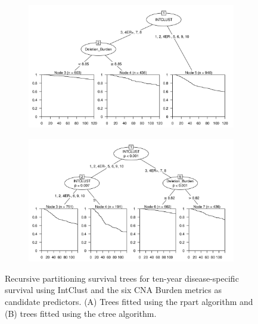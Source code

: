 \begin{figure}[!h]
\centering

\vspace{0.5cm}

\begin{subfigure}{\textwidth}
\subcaption{}
\includegraphics[width=1\textwidth]{../figures/Chapter_3/PartyKit_Survival_Burden_TenYearDSS_INTCLUST.png}
\end{subfigure}

\vspace{2cm}

\begin{subfigure}{\textwidth}
\subcaption{}
\includegraphics[width=1\textwidth]{../figures/Chapter_3/Ctree_Survival_Burden_TenYearDSS_INTCLUST.png}
\end{subfigure}

\vspace{0.5cm}

\caption[Recursive partitioning survival trees for ten-year disease-specific survival using IntClust and the six CNA Burden metrics as candidate predictors.]{Recursive partitioning survival trees for ten-year disease-specific survival using IntClust and the six CNA Burden metrics as candidate predictors. (A) Trees fitted using the rpart algorithm and (B) trees fitted using the ctree algorithm.}
\label{fig:INTCLUST_CNA_Burden_TenYearDSS}
\end{figure}


